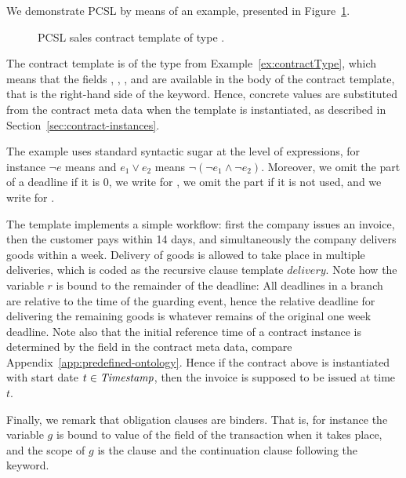 \begin{example}
  We demonstrate PCSL by means of an example, presented in
  Figure~\ref{fig:csl-ext-sales}.
  \begin{figure}[t]
    \centering
    
    \caption{PCSL sales contract template of type
      .}
    \label{fig:csl-ext-sales}
  \end{figure}
  The contract template is of the type
   from Example~\ref{ex:contractType}, which means
  that the fields , ,
  , and  are available in the
  body of the contract template, that is the right-hand side of the
   keyword. Hence, concrete values are substituted
  from the contract meta data when the template is instantiated, as
  described in Section~\ref{sec:contract-instances}.

  The example uses standard syntactic sugar at the level of
  expressions, for instance $\lnot e$ means  and $e_1 \lor e_2$ means $\lnot(\lnot e_1 \land \lnot
  e_2)$. Moreover, we omit the  part of a deadline if it
  is $0$, we write  for , we omit the
   part if it is not used, and we write  for \pcsl{val f = \\ $x_1$ -> $\ \cdots$ \\
    $x_n$ -> e}.

  The template implements a simple workflow: first the company issues
  an invoice, then the customer pays within 14 days, and
  simultaneously the company delivers goods within a week. Delivery of
  goods is allowed to take place in multiple deliveries, which is
  coded as the recursive clause template $\mathit{delivery}$. Note how
  the variable $r$ is bound to the remainder of the deadline: All
  deadlines in a \pcsl{then} branch are relative to the time of the
  guarding event, hence the relative deadline for delivering the remaining
  goods is whatever remains of the original one week deadline. Note
  also that the initial reference time of a contract instance is
  determined by the field \fieldname{startDate} in the contract meta
  data, compare Appendix~\ref{app:predefined-ontology}. Hence if the
  contract above is instantiated with start date $t \in \mathit{Timestamp}$,
  then the invoice is supposed to be issued at time $t$.

  Finally, we remark that obligation clauses are binders. That is, for
  instance the variable $g$ is bound to value of the field
   of the  transaction when
  it takes place, and the scope of $g$ is the \pcsl{where} clause and
  the continuation clause following the \pcsl{then} keyword.
\end{example}

